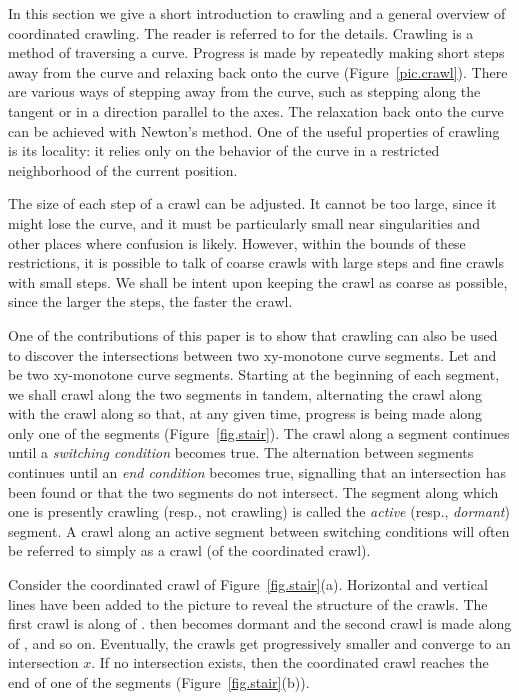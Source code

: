 In this section we give a short introduction to crawling and a general overview
of coordinated crawling.
The reader is referred to \cite{bhh,h,hl,or,Tim77} for the details.
Crawling is a method of traversing a curve.  
Progress is made by repeatedly making short steps away from the curve and
relaxing back onto the curve (Figure~\ref{pic.crawl}).
There are various ways of stepping away from the curve, such as stepping
along the tangent or in a direction parallel to the axes.
The relaxation back onto the curve can be achieved with Newton's method.
One of the useful properties of crawling is its locality: it relies only on the
behavior of the curve in a restricted neighborhood of the current position.

The size of each step of a crawl can be adjusted.
It cannot be too large, since it might lose the curve, and it must be particularly
small near singularities and other places where confusion is likely.
However, within the bounds of these restrictions, it is possible to talk of 
coarse crawls with large steps and fine crawls with small steps.
We shall be intent upon keeping the crawl as coarse as possible,
since the larger the steps, the faster the crawl.

One of the contributions of this paper is to show that crawling can also be used to 
discover the intersections between two xy-monotone curve segments.
Let  and  be two xy-monotone curve segments.
Starting at the beginning of each segment, we shall crawl along the two segments in 
tandem, alternating the crawl along  with the crawl along  so that,
at any given time, progress is being made along only one of the segments 
(Figure~\ref{fig.stair}).
The crawl along a segment continues until a {\em switching condition} becomes true.
The alternation between segments continues until an {\em end condition} becomes true, 
signalling that an intersection has been found or that the two segments do not intersect.
The segment along which one is presently crawling (resp., not crawling) is called the 
{\em active} (resp., {\em dormant}) segment.
A crawl along an active segment between switching conditions
will often be referred to simply as a crawl (of the coordinated crawl).

\begin{example}
\label{eg1}
Consider the coordinated crawl of Figure~\ref{fig.stair}(a).
Horizontal and vertical lines have been added to the picture 
to reveal the structure of the crawls.
The first crawl is along  of .
 then becomes dormant and the second crawl is made along  of ,
and so on.
Eventually, the crawls get progressively smaller and converge to an intersection $x$.
If no intersection exists, then the coordinated crawl reaches the end of one 
of the segments (Figure~\ref{fig.stair}(b)).
\end{example}

